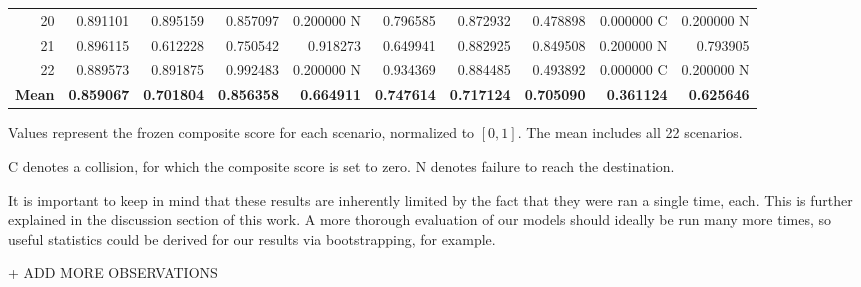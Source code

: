 \documentclass[10pt]{reportMaster}
\begin{document}
\begin{table}[t]
\begin{threeparttable}
{\begin{tabular}{@{}r r r r r r r r r r@{}}
20
& 0.891101 & 0.895159 & 0.857097
& 0.200000 N & 0.796585 & 0.872932
& 0.478898 & 0.000000 C & 0.200000 N \\

21
& 0.896115 & 0.612228 & 0.750542
& 0.918273 & 0.649941 & 0.882925
& 0.849508 & 0.200000 N & 0.793905 \\

22
& 0.889573 & 0.891875 & 0.992483
& 0.200000 N & 0.934369 & 0.884485
& 0.493892 & 0.000000 C & 0.200000 N \\

\midrule
\textbf{Mean}
& \textbf{0.859067}
& \textbf{0.701804}
& \textbf{0.856358}
& \textbf{0.664911}
& \textbf{0.747614}
& \textbf{0.717124}
& \textbf{0.705090}
& \textbf{0.361124}
& \textbf{0.625646} \\

\bottomrule
\end{tabular}%
}

\begin{tablenotes}[flushleft]
\footnotesize
\item Values represent the frozen composite score
for each scenario, normalized to $[0,1]$.
The mean includes all 22 scenarios.
\item C denotes a collision, for which the composite
score is set to zero. N denotes failure to reach
the destination.
\end{tablenotes}

\end{threeparttable}
\end{table}

It is important to keep in mind that these results are inherently limited by the fact that they were ran a single time, each. This is further explained in the discussion section of this work. A more thorough evaluation of our models should ideally be run many more times, so useful statistics could be derived for our results via bootstrapping, for example.  

+ ADD MORE OBSERVATIONS
\end{document}
